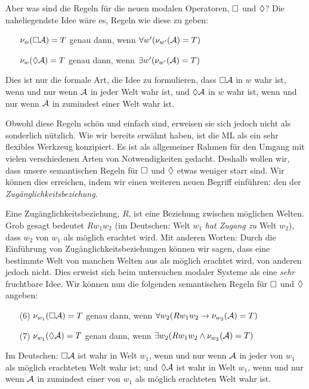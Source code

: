 Aber was sind die Regeln für die neuen modalen Operatoren, $\Box$ und $\Diamond$? Die naheliegendste Idee wäre es, Regeln wie diese zu geben:
\begin{itemize}
	\item[]$\nu_w(\Box \mathcal{A})=T$ genau dann, wenn $\forall w' (\nu_{w'}(\mathcal{A})=T)$
	\item[]$\nu_w(\Diamond \mathcal{A})=T$ genau dann, wenn $\exists w' (\nu_{w'}(\mathcal{A})=T)$
\end{itemize}
Dies ist nur die formale Art, die Idee zu formulieren, dass $\Box\mathcal{A}$ in $w$ wahr ist, wenn und nur wenn $\mathcal{A}$ in jeder Welt wahr ist, und $\Diamond\mathcal{A}$ in $w$ wahr ist, wenn und nur wenn $\mathcal{A}$ in zumindest einer Welt wahr ist.

Obwohl diese Regeln schön und einfach sind, erweisen sie sich jedoch nicht als sonderlich nützlich. Wie wir bereits erwähnt haben, ist die ML als ein sehr flexibles Werkzeug konzipiert. Es ist als allgemeiner Rahmen für den Umgang mit vielen verschiedenen Arten von Notwendigkeiten gedacht. Deshalb wollen wir, dass unsere semantischen Regeln für $\Box$ und $\Diamond$ etwas weniger starr sind. Wir können dies erreichen, indem wir einen weiteren neuen Begriff einführen: den der \emph{Zugänglichkeitsbeziehung}.

Eine Zugänglichkeitsbeziehung, $R$, ist eine Beziehung zwischen möglichen Welten. Grob gesagt bedeutet $Rw_1w_2$ (im Deutschen: Welt $w_1$ \emph{hat Zugang zu} Welt $w_2$), dass $w_2$ von $w_1$ als möglich erachtet wird. Mit anderen Worten: Durch die Einführung von Zugänglichkeitsbeziehungen können wir sagen, dass eine bestimmte Welt von manchen Welten aus als möglich erachtet wird, von anderen jedoch nicht. Dies erweist sich beim untersuchen modaler Systeme als eine \emph{sehr} fruchtbare Idee. Wir können nun die folgenden semantischen Regeln für $\Box$ und $\Diamond$ angeben:
\begin{itemize}
	\item[(6)]$\nu_{w_1}(\Box \mathcal{A})=T$ genau dann, wenn $\forall w_2 (Rw_1w_2\rightarrow \nu_{w_2}(\mathcal{A})=T)$
	\item[(7)]$\nu_{w_1}(\Diamond \mathcal{A})=T$ genau dann, wenn $\exists w_2 (Rw_1w_2\wedge \nu_{w_2}(\mathcal{A})=T)$
\end{itemize}
Im Deutschen: $\Box\mathcal{A}$ ist wahr in Welt $w_1$, wenn und nur wenn $\mathcal{A}$ in jeder von $w_1$ als möglich erachteten Welt wahr ist; und $\Diamond\mathcal{A}$ ist wahr in Welt $w_1$, wenn und nur wenn $\mathcal{A}$ in zumindest einer von $w_1$ als möglich erachteten Welt wahr ist.

